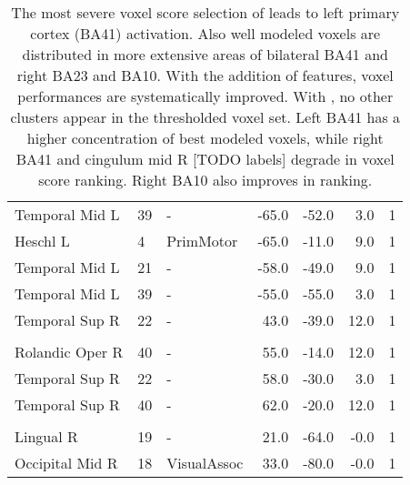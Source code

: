 \begin{table}
\begin{ThreePartTable}
\begin{tabularx}{\textwidth}{L l L *{3}{r} *{1}{R}}
\toprule
{} \\
\midrule
Temporal Mid L & 39 & - & -65.0 & -52.0 & 3.0 & 1 \\
Heschl L & 4 & PrimMotor & -65.0 & -11.0 & 9.0 & 1 \\
Temporal Mid L & 21 & - & -58.0 & -49.0 & 9.0 & 1 \\
Temporal Mid L & 39 & - & -55.0 & -55.0 & 3.0 &  1 \\
Temporal Sup R & 22 & - & 43.0 & -39.0 & 12.0 &  1 \\
\toprule
{}\\
\midrule
Rolandic Oper R & 40 & - & 55.0 & -14.0 & 12.0 &  1 \\
Temporal Sup R & 22 & - & 58.0 & -30.0 & 3.0 &  1 \\
Temporal Sup R & 40 & - & 62.0 & -20.0 & 12.0 &  1 \\

\toprule
{} \\
\midrule
Lingual R & 19 & - & 21.0 & -64.0 & -0.0 &  1 \\
Occipital Mid R & 18 & VisualAssoc & 33.0 & -80.0 & -0.0 &  1 \\

\bottomrule
    \end{tabularx}
\end{ThreePartTable}
\caption[ F-test Significant Voxels]{The most severe voxel score selection of  leads to left primary cortex (BA41) activation. Also well modeled voxels are distributed in more extensive areas of bilateral BA41 and right BA23 and BA10. With the addition of  features, voxel performances are systematically improved. With , no other clusters appear in the thresholded voxel set. Left BA41 has a higher concentration of best modeled voxels, while right BA41 and cingulum mid R [TODO labels] degrade in voxel score ranking. Right BA10 also improves in ranking. \label{tab:Ftest}}
\end{table}